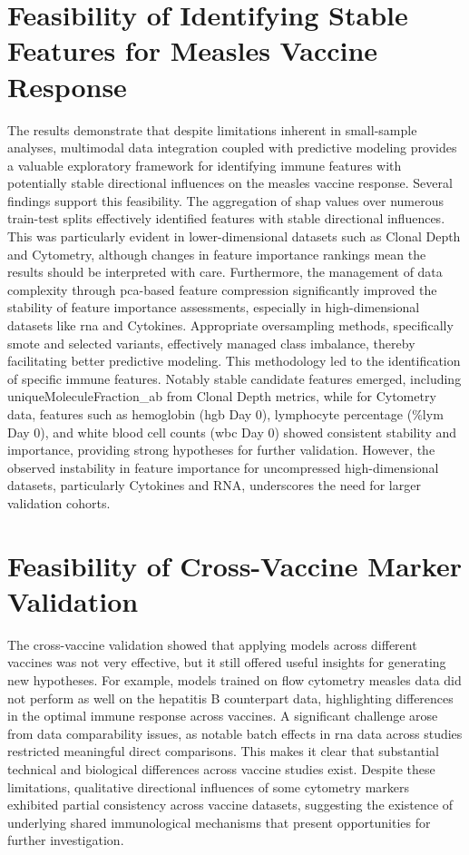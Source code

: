 \documentclass[12pt,a4paper]{report}
\begin{document}
\section{Feasibility of Identifying Stable Features for Measles Vaccine Response}
\noindent
The results demonstrate that despite limitations inherent in small-sample analyses, multimodal data integration coupled with predictive modeling provides a valuable exploratory framework for identifying immune features with potentially stable directional influences on the measles vaccine response. Several findings support this feasibility. The aggregation of \acrshort{shap} values over numerous train-test splits effectively identified features with stable directional influences. This was particularly evident in lower-dimensional datasets such as Clonal Depth and Cytometry, although changes in feature importance rankings mean the results should be interpreted with care. Furthermore, the management of data complexity through \acrshort{pca}-based feature compression significantly improved the stability of feature importance assessments, especially in high-dimensional datasets like \acrshort{rna} and Cytokines. Appropriate oversampling methods, specifically \acrshort{smote} and selected variants, effectively managed class imbalance, thereby facilitating better predictive modeling. This methodology led to the identification of specific immune features. Notably stable candidate features emerged, including uniqueMoleculeFraction\_ab from Clonal Depth metrics, while for Cytometry data, features such as hemoglobin (\acrshort{hgb} Day 0), lymphocyte percentage (\%\acrshort{lym} Day 0), and white blood cell counts (\acrshort{wbc} Day 0) showed consistent stability and importance, providing strong hypotheses for further validation. However, the observed instability in feature importance for uncompressed high-dimensional datasets, particularly Cytokines and RNA, underscores the need for larger validation cohorts.

\section{Feasibility of Cross-Vaccine Marker Validation}
\noindent
The cross-vaccine validation showed that applying models across different vaccines was not very effective, but it still offered useful insights for generating new hypotheses. For example, models trained on flow cytometry measles data did not perform as well on the hepatitis B counterpart data, highlighting differences in the optimal immune response across vaccines. A significant challenge arose from data comparability issues, as notable batch effects in \acrshort{rna} data across studies restricted meaningful direct comparisons. This makes it clear that substantial technical and biological differences across vaccine studies exist. Despite these limitations, qualitative directional influences of some cytometry markers exhibited partial consistency across vaccine datasets, suggesting the existence of underlying shared immunological mechanisms that present opportunities for further investigation.
\end{document}

